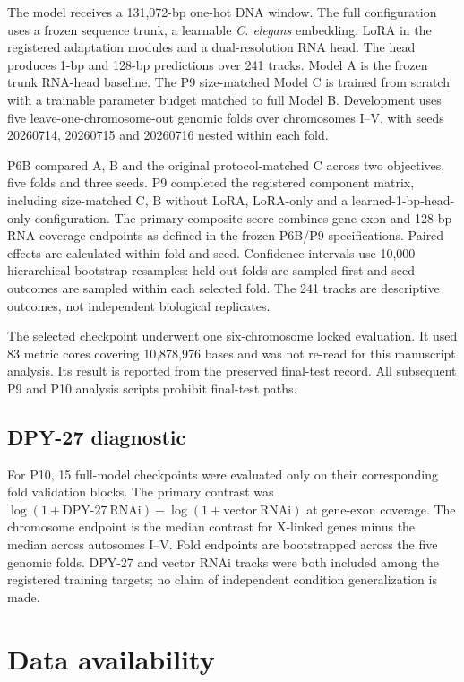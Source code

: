 \documentclass[pdflatex,sn-nature]{sn-jnl}
\begin{document}
The model receives a 131,072-bp one-hot DNA window. The full configuration uses a frozen sequence trunk, a learnable \textit{C. elegans} embedding, LoRA in the registered adaptation modules and a dual-resolution RNA head. The head produces 1-bp and 128-bp predictions over 241 tracks. Model A is the frozen trunk RNA-head baseline. The P9 size-matched Model C is trained from scratch with a trainable parameter budget matched to full Model B. Development uses five leave-one-chromosome-out genomic folds over chromosomes I--V, with seeds 20260714, 20260715 and 20260716 nested within each fold.

P6B compared A, B and the original protocol-matched C across two objectives, five folds and three seeds. P9 completed the registered component matrix, including size-matched C, B without LoRA, LoRA-only and a learned-1-bp-head-only configuration. The primary composite score combines gene-exon and 128-bp RNA coverage endpoints as defined in the frozen P6B/P9 specifications. Paired effects are calculated within fold and seed. Confidence intervals use 10,000 hierarchical bootstrap resamples: held-out folds are sampled first and seed outcomes are sampled within each selected fold. The 241 tracks are descriptive outcomes, not independent biological replicates.

The selected checkpoint underwent one six-chromosome locked evaluation. It used 83 metric cores covering 10,878,976 bases and was not re-read for this manuscript analysis. Its result is reported from the preserved final-test record. All subsequent P9 and P10 analysis scripts prohibit final-test paths.

\subsection{DPY-27 diagnostic}

For P10, 15 full-model checkpoints were evaluated only on their corresponding fold validation blocks. The primary contrast was $\log(1 + \mathrm{DPY\text{-}27\ RNAi}) - \log(1 + \mathrm{vector\ RNAi})$ at gene-exon coverage. The chromosome endpoint is the median contrast for X-linked genes minus the median across autosomes I--V. Fold endpoints are bootstrapped across the five genomic folds. DPY-27 and vector RNAi tracks were both included among the registered training targets; no claim of independent condition generalization is made.

\section*{Data availability}
\end{document}
